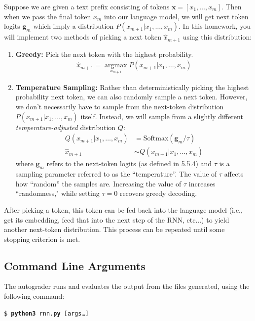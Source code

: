 \documentclass[11pt,addpoints,answers]{exam}
\newcommand{\gv}{\mathbf{g}}
\newcommand{\xv}{\mathbf{x}}
\newcommand \argmax {\operatorname*{argmax}}
\begin{document}
Suppose we are given a text prefix consisting of tokens $\xv = [x_1, \ldots, x_m]$. Then when we pass the final token $x_m$ into our language model, we will get next token logits $\gv_m$ which imply a distribution $P(x_{m+1} | x_1, \ldots, x_m)$. In this homework, you will implement two methods of picking a next token $\hat{x}_{m+1}$ using this distribution:

\begin{enumerate}
    \item \textbf{Greedy:} Pick the next token with the highest probability.
    \begin{align*}
        \hat{x}_{m+1} = \argmax_{x_{m+1}} P(x_{m+1} | x_1, \ldots, x_m)
    \end{align*}
    \item \textbf{Temperature Sampling:} Rather than deterministically picking the highest probability next token, we can also randomly sample a next token. However, we don't necessarily have to sample from the next-token distribution $P(x_{m+1} | x_1, \ldots, x_m)$ itself. Instead, we will sample from a slightly different \emph{temperature-adjusted} distribution $Q$:
    \begin{align*}
        Q(x_{m+1} | x_1, \ldots, x_m) &= \text{Softmax}(\gv_m / \tau) \\
        \hat{x}_{m+1} &\sim Q(x_{m+1} | x_1, \ldots, x_m)
    \end{align*}
    where $\gv_m$ refers to the next-token logits (as defined in 5.5.4) and $\tau$ is a sampling parameter referred to as the ``temperature''. The value of $\tau$ affects how ``random'' the samples are. Increasing the value of $\tau$ increases ``randomness," while setting $\tau = 0$ recovers greedy decoding.
\end{enumerate}
After picking a token, this token can be fed back into the language model (i.e., get its embedding, feed that into the next step of the RNN, etc...) to yield another next-token distribution. This process can be repeated until some stopping criterion is met.



\subsection{Command Line Arguments}\label{command}
The autograder runs and evaluates the output from the files generated, using the following command:

\begin{tabbing}
\=\texttt{\$ \textbf{python3} rnn.\textbf{py} [args\dots]}\\
\end{tabbing}
    
\end{document}
